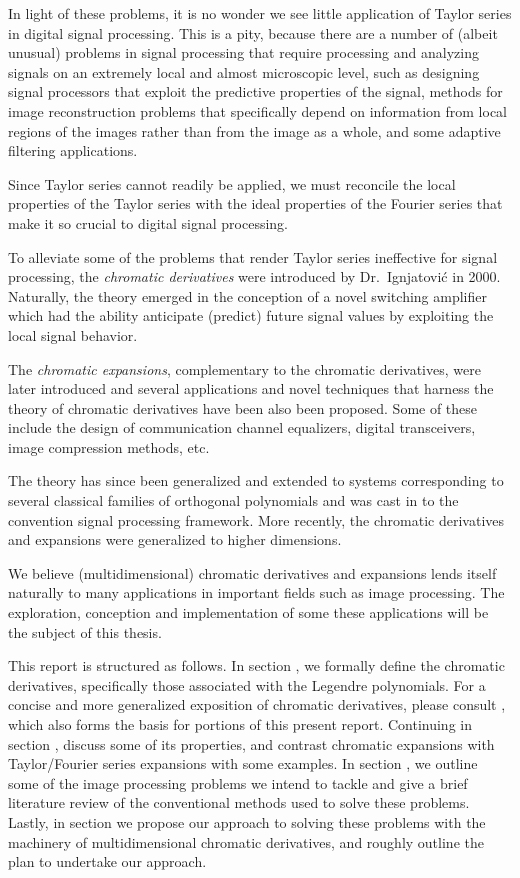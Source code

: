 \documentclass[11pt]{article} %
\theoremstyle{plain}
\theoremstyle{definition}
\theoremstyle{remark}
\begin{document}
In light of these problems, it is no wonder we see little application of Taylor series
in digital signal processing. This is a pity, because there are a number of (albeit unusual) 
problems in signal processing that require processing and analyzing signals on an extremely
local and almost microscopic level, such as designing signal processors that exploit 
the predictive properties of the signal, methods for image reconstruction problems that 
specifically depend on information from local regions of the images rather than from the 
image as a whole, and some adaptive filtering applications.

Since Taylor series cannot readily be applied, we must reconcile the local properties 
of the Taylor series with the ideal properties of the Fourier series that make it so 
crucial to digital signal processing.

To alleviate some of the problems that render Taylor series ineffective for signal processing, 
the \emph{chromatic derivatives} were introduced by Dr.~Ignjatovi\'{c} in 2000. Naturally, the
theory emerged in the conception of a novel switching amplifier which had the ability anticipate
(predict) future signal values by exploiting the local signal behavior.

The \emph{chromatic expansions}, complementary to the chromatic derivatives, were later introduced   
and several applications and novel techniques that harness the theory of chromatic derivatives
have been also been proposed. Some of these include the design of communication channel
equalizers, digital transceivers, image compression methods, etc.

The theory has since been generalized and extended to systems corresponding to several classical 
families of orthogonal polynomials and was cast in to the convention signal processing framework. 
More recently, the chromatic derivatives and expansions were generalized to 
higher dimensions. 

We believe (multidimensional) chromatic derivatives and expansions lends itself naturally
to many applications in important fields such as image processing. The exploration, 
conception and implementation of some these applications will be the subject of this thesis. 

This report is structured as follows. In section , we formally define the chromatic derivatives, 
specifically those associated with the Legendre polynomials. For a concise and more generalized
exposition of chromatic derivatives, please consult , which also forms the basis for portions 
of this present report. Continuing in section , discuss some of its properties, and contrast 
chromatic expansions with Taylor/Fourier series expansions with some examples. In section , 
we outline some of the image processing problems we intend to tackle and give a brief literature 
review of the conventional methods used to solve these problems. Lastly, in section  we propose 
our approach to solving these problems with the machinery of multidimensional chromatic derivatives, 
and roughly outline the plan to undertake our approach.
\end{document}
